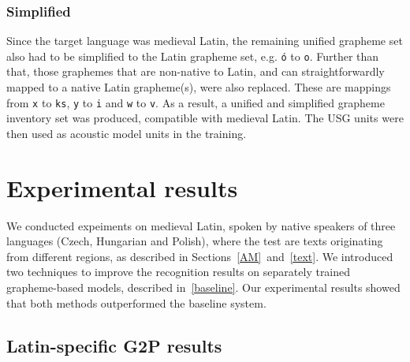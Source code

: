 \documentclass[runningheads,a4paper]{llncs}
\begin{document}
\subsubsection{Simplified}\label{simplified}
Since the target language was medieval Latin, the remaining unified grapheme set also had to be simplified to the Latin grapheme set, e.g. \texttt{\'{o}} to \texttt{o}.
Further than that, those graphemes that are non-native to Latin, and can straightforwardly mapped to a native Latin grapheme(s), were also replaced.
These are mappings from \texttt{x} to \texttt{ks}, \texttt{y} to \texttt{i} and \texttt{w} to \texttt{v}.
As a result, a unified and simplified grapheme inventory set was produced, compatible with medieval Latin.
The USG units were then used as acoustic model units in the training.
\section{Experimental results}\label{results}
We conducted expeiments on medieval Latin, spoken by native speakers of three languages (Czech, Hungarian and Polish), where the test are texts originating from different regions, as described in Sections~\ref{AM}~and~\ref{text}.
We introduced two techniques to improve the recognition results on separately trained grapheme-based models, described in~\ref{baseline}.
Our experimental results showed that both methods outperformed the baseline system.
\subsection{Latin-specific G2P results}
\end{document}
